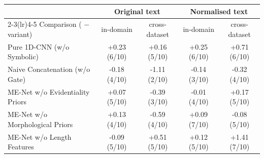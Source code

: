 \begin{tabular}{lcccc}
\toprule
& \multicolumn{2}{c}{Original text} & \multicolumn{2}{c}{Normalised text} \\
\cmidrule(lr){2-3}\cmidrule(lr){4-5}
Comparison (\menet{} $-$ variant) & in-domain & cross-dataset & in-domain & cross-dataset \\
\midrule
Pure 1D-CNN (w/o Symbolic) & +0.23 (6/10) & +0.16 (5/10) & +0.25 (6/10) & +0.71 (6/10) \\
Naive Concatenation (w/o Gate) & -0.18 (4/10) & -1.11 (2/10) & -0.14 (3/10) & -0.32 (4/10) \\
ME-Net w/o Evidentiality Priors & +0.07 (5/10) & -0.39 (3/10) & -0.01 (4/10) & +0.17 (5/10) \\
ME-Net w/o Morphological Priors & +0.13 (4/10) & -0.59 (4/10) & +0.09 (7/10) & -0.08 (5/10) \\
ME-Net w/o Length Features & -0.09 (5/10) & +0.51 (5/10) & +0.12 (5/10) & +1.41 (7/10) \\
\bottomrule
\end{tabular}%
